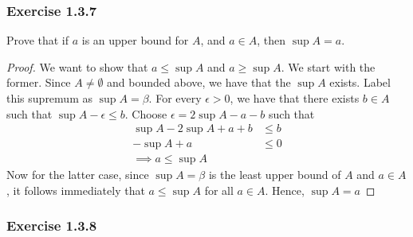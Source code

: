 \subsubsection{Exercise 1.3.7}

Prove that if \( a \) is an upper bound for \( A \), and \( a \in A \), then \( \sup A = a \).
    

\begin{proof}
    We want to show that \( a \leq \sup A \) and \( a \geq \sup A \). We start with the former. Since \( A \neq \emptyset \) and bounded above, we have that the \( \sup A \) exists. Label this supremum as \( \sup A = \beta \). For every \( \epsilon > 0 \), we have that there exists \( b \in A \) such that \( \sup A - \epsilon \leq b \). Choose \( \epsilon = 2 \sup A  - a - b \) such that 
    \begin{align*}
        \sup A - 2 \sup A + a + b &\leq b \\ 
        -\sup A +  a &\leq  0 \\
       \implies a \leq \sup A    
    \end{align*}
    Now for the latter case, since \( \sup A = \beta \) is the least upper bound of \( A \) and 
    \( a \in A \), it follows immediately that \( a \leq \sup A \) for all \( a \in A\). Hence, \( \sup A = a \)


\end{proof}




\subsubsection{Exercise 1.3.8}

